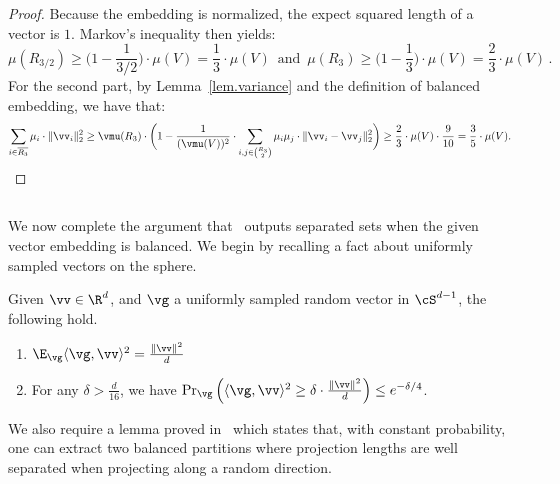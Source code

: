 \documentclass[letterpaper]{article}
\begin{document}
\unbalancedprevious*
\begin{proof}
Because the embedding is normalized, the expect squared length of a vector is $1$. Markov's inequality then yields:
\begin{equation*}
\mu(R_{3/2}) \geq \bigg( 1 - \frac{1}{3/2} \bigg) \cdot \mu(V)
= \frac{1}{3} \cdot \mu(V) \, \textrm{ and } \, \mu(R_{3}) \geq \bigg( 1 - \frac{1}{3} \bigg) \cdot \mu(V) = \frac{2}{3} \cdot \mu(V)\,.
\end{equation*}
For the second part, by Lemma~\ref{lem.variance} and the definition of balanced embedding, we have that:
\begin{equation*}
\sum_{i \in \overline{R_3}} \mu_i \cdot \lVert \vv_i \rVert_2^2
\geq \vmu(R_3) \cdot  \bigg( 1 - \frac{1}{(\vmu(V))^2} \cdot \sum_{i,j \in \binom{R_3}{2}} \mu_i \mu_j \cdot \lVert \vv_i - \vv_j \rVert_2^2 \bigg) \geq \frac{2}{3} \cdot \mu(V) \cdot \frac{9}{10} = \frac{3}{5} \cdot \mu(V).
\end{equation*}
\end{proof}
 
\subsection{}
\label{sec.appendix.omitted.separated}
We now complete the argument that \roundcut~outputs separated sets when the given vector embedding is balanced. We begin by recalling a fact about uniformly sampled vectors on the sphere.

\begin{lemma}
\label{lem.gaussian-facts}
Given $\vv \in \R^{d}$, and $\vg$ a uniformly sampled random vector in $\cS^{d-1}$, the following hold.
\begin{enumerate}
\item $\E_{\vg} \langle \vg, \vv \rangle^2 = \frac{\lVert \vv \rVert^2}{d}$

\item For any $\delta > \frac{d}{16}$, we have $\Pr_{\vg} \Big( \langle \vg, \vv \rangle^2 \geq \delta \cdot \frac{\lVert \vv \rVert^2}{d} \Big) \leq e^{-\delta / 4}$.
\end{enumerate}
\end{lemma}

We also require a lemma proved in~\cite{LorenzosThesis} which states that, with constant probability, one can extract two balanced partitions where projection lengths are well separated when projecting along a random direction.
\end{document}
